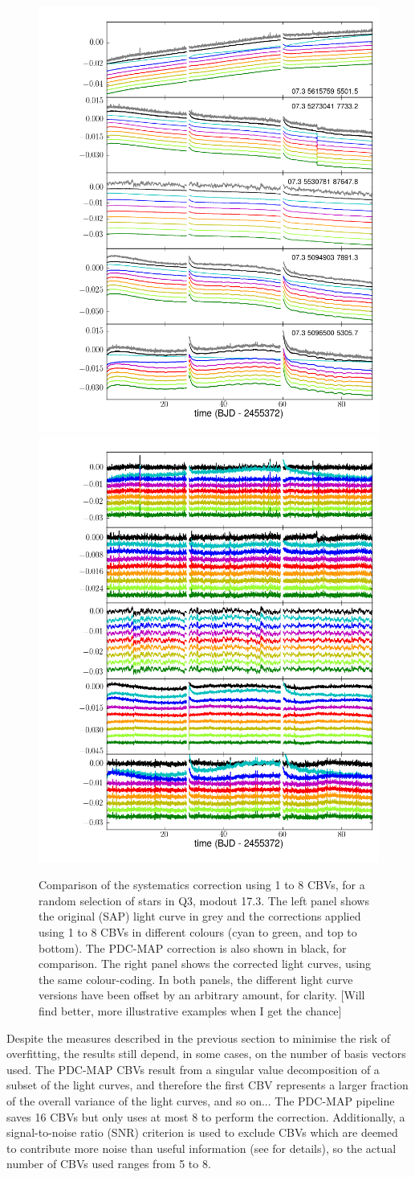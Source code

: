 \documentclass[useAMS,usenatbib]{mn2e}
\begin{document}
\begin{figure}
  \centering
  \includegraphics[width=0.49\linewidth]{q6_mod07_out3_cbv_examples_diff.png}
  \includegraphics[width=0.49\linewidth]{q6_mod07_out3_cbv_examples.png}
  \caption{Comparison of the systematics correction using 1 to 8 CBVs,
    for a random selection of stars in Q3, modout 17.3. The left panel
    shows the original (SAP) light curve in grey and the corrections
    applied using 1 to 8 CBVs in different colours (cyan to green, and
    top to bottom). The PDC-MAP correction is also shown in black, for
    comparison. The right panel shows the corrected light curves,
    using the same colour-coding. In both panels, the different light
    curve versions have been offset by an arbitrary amount, for
    clarity. [Will find better, more illustrative examples when I get
    the chance]}
  \label{fig:ncbv_ex}
\end{figure}

Despite the measures described in the previous section to minimise the
risk of overfitting, the results still depend, in some cases, on the number of basis vectors
used. The PDC-MAP CBVs result from a singular value decomposition of a
subset of the light curves, and therefore the first CBV represents a
larger fraction of the overall variance of the light curves, and so
on... The PDC-MAP pipeline saves 16 CBVs but only uses at most 8 to
perform the correction. Additionally, a signal-to-noise ratio (SNR)
criterion is used to exclude CBVs which are deemed to contribute more
noise than useful information (see \citealt{smi+12} for details), so
the actual number of CBVs used ranges from 5 to 8. 
\end{document}
